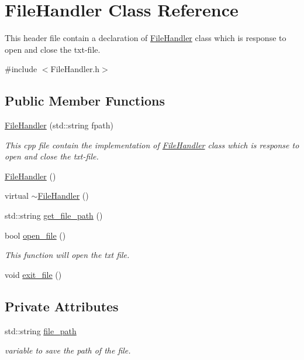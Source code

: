 \hypertarget{class_file_handler}{}\section{File\+Handler Class Reference}
\label{class_file_handler}


This header file contain a declaration of \mbox{\hyperlink{class_file_handler}{File\+Handler}} class which is response to open and close the txt-\/file.  




{\ttfamily \#include $<$File\+Handler.\+h$>$}

\subsection*{Public Member Functions}
\begin{DoxyCompactItemize}
\item 
\mbox{\hyperlink{class_file_handler_ab6dc27856e7eef893879d381d62dbc32}{File\+Handler}} (std\+::string fpath)
\begin{DoxyCompactList}\small\item\em This cpp file contain the implementation of \mbox{\hyperlink{class_file_handler}{File\+Handler}} class which is response to open and close the txt-\/file. \end{DoxyCompactList}\item 
\mbox{\hyperlink{class_file_handler_a0d1ac8e9911e19255e8b2d99c2d93f43}{File\+Handler}} ()
\item 
virtual \mbox{\hyperlink{class_file_handler_a1ce10cd0ad31b313a8d526fba6f1e676}{$\sim$\+File\+Handler}} ()
\item 
std\+::string \mbox{\hyperlink{class_file_handler_ad3960a2c229347073f6ffc53e0ebceec}{get\+\_\+file\+\_\+path}} ()
\item 
bool \mbox{\hyperlink{class_file_handler_aefc9976ff2b2788298a65eba6d6d27a2}{open\+\_\+file}} ()
\begin{DoxyCompactList}\small\item\em This function will open the txt file. \end{DoxyCompactList}\item 
void \mbox{\hyperlink{class_file_handler_ab8bd470616da49ac3fc662f161db4b9b}{exit\+\_\+file}} ()
\end{DoxyCompactItemize}
\subsection*{Private Attributes}
\begin{DoxyCompactItemize}
\item 
std\+::string \mbox{\hyperlink{class_file_handler_a1683e00c3112530e697703c327e21c9b}{file\+\_\+path}}
\begin{DoxyCompactList}\small\item\em variable to save the path of the file. \end{DoxyCompactList}\end{DoxyCompactItemize}


